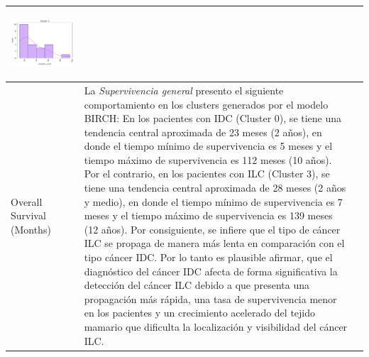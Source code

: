 \begin{table}
\begin{threeparttable}
\begin{tabular}{p{2.5cm} p{7cm} p{6.5cm}}
			\begin{center}\includegraphics[width=1\linewidth]{NOTEBOOK/IMAGENES_BIRCH_CLUSTERING/8_Cluster_3_mutation_count}\end{center}
			
			\\ \hline
			Overall Survival (Months)
			& La \textit{Supervivencia general} presento el siguiente comportamiento en los clusters generados por el modelo BIRCH: En los pacientes con IDC (Cluster 0), se tiene una tendencia central aproximada de 23 meses (2 años), en donde el tiempo mínimo de supervivencia es 5 meses y el tiempo máximo de supervivencia es 112 meses (10 años). Por el contrario, en los pacientes con ILC (Cluster 3), se tiene una tendencia central aproximada de 28 meses (2 años y medio), en donde el tiempo mínimo de supervivencia es 7 meses y el tiempo máximo de supervivencia es 139 meses (12 años). Por consiguiente, se infiere que el tipo de cáncer ILC se propaga de manera más lenta en comparación con el tipo cáncer IDC. Por lo tanto es plausible afirmar, que el diagnóstico del cáncer IDC afecta de forma significativa la detección del cáncer ILC debido a que presenta una propagación más rápida, una tasa de supervivencia menor en los pacientes y un crecimiento acelerado del tejido mamario que dificulta la localización y visibilidad del cáncer ILC. 
			

\end{tabular}
\end{threeparttable}
\end{table}

